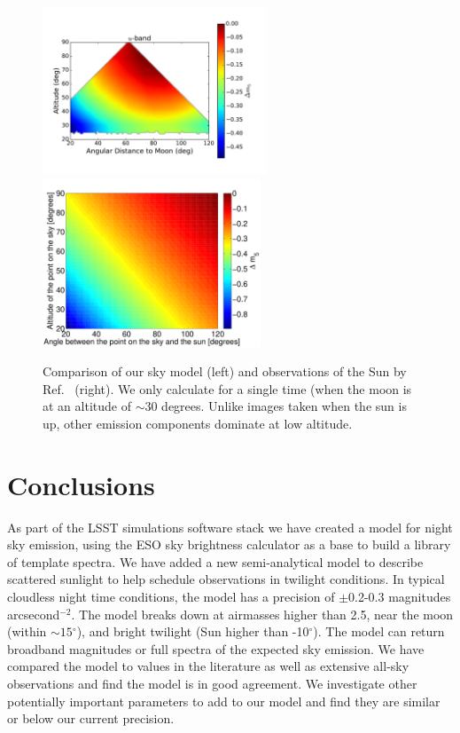 \documentclass[]{spie}
\newcommand\degree{{^\circ}}
\begin{document}
\begin{figure}
  \begin{center}
  \includegraphics[height=5cm]{plots/deltam5.pdf}\includegraphics[height=5cm]{plots/a1_alt_angle_meshgrid.pdf}
  \end{center}
  \caption{ Comparison of our sky model (left) and observations of the Sun by Ref.~ (right).  We only calculate for a single time (when the moon is at an altitude of $\sim 30$ degrees. Unlike images taken when the sun is up, other emission components dominate at low altitude.  \label{fig:cCompare}}
\end{figure}

\section{Conclusions}

As part of the LSST simulations software stack we have created a model for night sky emission, using the ESO sky brightness calculator as a base to build a library of template spectra.  We have added a new semi-analytical model to describe scattered sunlight to help schedule observations in twilight conditions.  In typical cloudless night time conditions, the model has a precision of $\pm$0.2-0.3 magnitudes arcsecond$^{-2}$. The model breaks down at airmasses higher than 2.5, near the moon (within $\sim15\degree$), and bright twilight (Sun higher than -10$\degree$).  The model can return broadband magnitudes or full spectra of the expected sky emission.  We have compared the model to values in the literature as well as extensive all-sky observations and find the model is in good agreement. We investigate other potentially important parameters to add to our model and find they are similar or below our current precision. 
\end{document}

